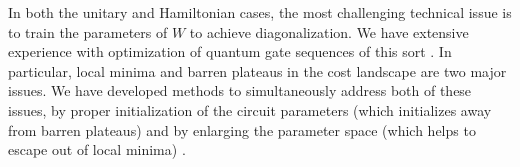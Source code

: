 \documentclass[11pt]{article}
\begin{document}
In both the unitary and Hamiltonian cases, the most challenging technical issue is to train the parameters of $W$ to achieve diagonalization. We have extensive experience with optimization of quantum gate sequences of this sort \cite{Khatri2018, LaRose2018}. In particular, local minima and barren plateaus in the cost landscape are two major issues. We have developed methods to simultaneously address both of these issues, by proper initialization of the circuit parameters (which initializes away from barren plateaus) and by enlarging the parameter space (which helps to escape out of local minima) \cite{LaRose2018}. 








\end{document}
